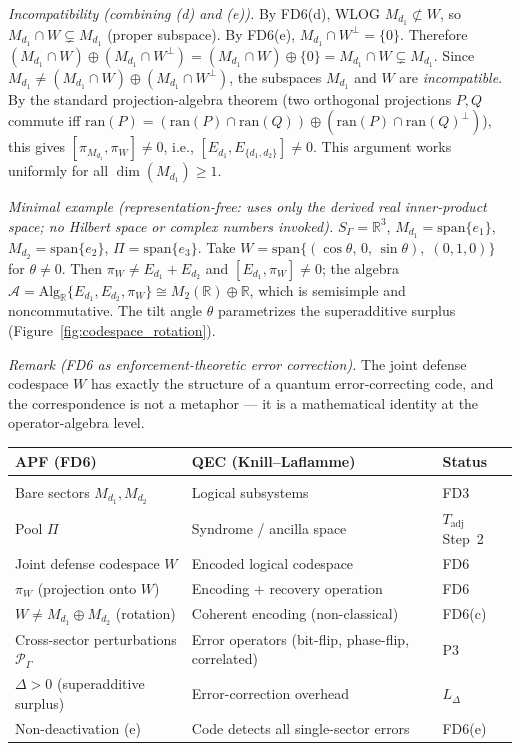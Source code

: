 \documentclass[11pt]{article}
\theoremstyle{remark}
\begin{document}
\begin{tcolorbox}[defbox, title={Definition FD6: Joint Enforcement Operation (from $L_\Pi$)}]
\smallskip\noindent\textit{Incompatibility (combining (d) and (e)).}  By FD6(d), WLOG $M_{d_1} \not\subset W$, so $M_{d_1} \cap W \subsetneq M_{d_1}$ (proper subspace).  By FD6(e), $M_{d_1} \cap W^\perp = \{0\}$.  Therefore $(M_{d_1} \cap W) \oplus (M_{d_1} \cap W^\perp) = (M_{d_1} \cap W) \oplus \{0\} = M_{d_1} \cap W \subsetneq M_{d_1}$.  Since $M_{d_1} \ne (M_{d_1} \cap W) \oplus (M_{d_1} \cap W^\perp)$, the subspaces $M_{d_1}$ and $W$ are \emph{incompatible}.  By the standard projection-algebra theorem (two orthogonal projections $P, Q$ commute iff $\mathrm{ran}(P) = (\mathrm{ran}(P) \cap \mathrm{ran}(Q)) \oplus (\mathrm{ran}(P) \cap \mathrm{ran}(Q)^\perp)$), this gives $[\pi_{M_{d_1}}, \pi_W] \ne 0$, i.e., $[E_{d_1}, E_{\{d_1,d_2\}}] \ne 0$.  This argument works uniformly for all $\dim(M_{d_1}) \ge 1$.

\smallskip\noindent\textit{Minimal example (representation-free: uses only the derived real inner-product space; no Hilbert space or complex numbers invoked).}  $S_\Gamma = \mathbb{R}^3$, $M_{d_1} = \mathrm{span}\{e_1\}$, $M_{d_2} = \mathrm{span}\{e_2\}$, $\Pi = \mathrm{span}\{e_3\}$.  Take $W = \mathrm{span}\{(\cos\theta,\, 0,\, \sin\theta),\; (0,1,0)\}$ for $\theta \ne 0$.  Then $\pi_W \ne E_{d_1}+E_{d_2}$ and $[E_{d_1}, \pi_W] \ne 0$; the algebra $\mathcal{A} = \mathrm{Alg}_\mathbb{R}\{E_{d_1}, E_{d_2}, \pi_W\} \cong M_2(\mathbb{R}) \oplus \mathbb{R}$, which is semisimple and noncommutative.  The tilt angle $\theta$ parametrizes the superadditive surplus (Figure~\ref{fig:codespace_rotation}).

\smallskip\noindent\textit{Remark (FD6 as enforcement-theoretic error correction).}  The joint defense codespace $W$ has exactly the structure of a quantum error-correcting code, and the correspondence is not a metaphor --- it is a mathematical identity at the operator-algebra level.

\smallskip\noindent
\small
\begin{tabular}{@{}p{3.8cm}p{4.5cm}l@{}}
\textbf{APF (FD6)} & \textbf{QEC (Knill--Laflamme)} & \textbf{Status} \\[2pt]
\hline\\[-6pt]
Bare sectors $M_{d_1}, M_{d_2}$ & Logical subsystems & FD3 \\[2pt]
Pool $\Pi$ & Syndrome / ancilla space & $T_{\mathrm{adj}}$ Step~2 \\[2pt]
Joint defense codespace $W$ & Encoded logical codespace & FD6 \\[2pt]
$\pi_W$ (projection onto $W$) & Encoding + recovery operation & FD6 \\[2pt]
$W \ne M_{d_1} \oplus M_{d_2}$ (rotation) & Coherent encoding (non-classical) & FD6(c) \\[2pt]
Cross-sector perturbations $\mathcal{P}_\Gamma$ & Error operators (bit-flip, phase-flip, correlated) & P3 \\[2pt]
$\Delta > 0$ (superadditive surplus) & Error-correction overhead & $L_\Delta$ \\[2pt]
Non-deactivation (e) & Code detects all single-sector errors & FD6(e) \\[2pt]
\end{tabular}


\end{tcolorbox}
\end{document}
